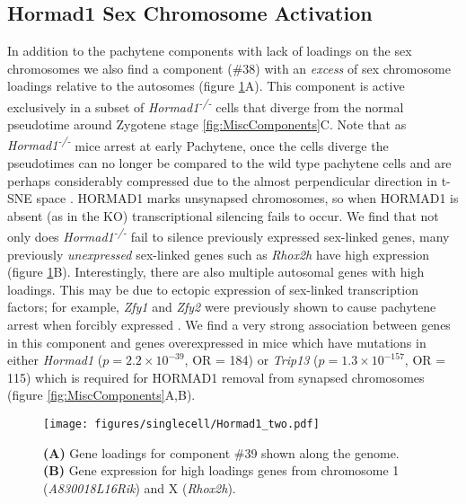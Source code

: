 \subsection{Hormad1 Sex Chromosome Activation}
In addition to the pachytene components with lack of loadings on the sex chromosomes we also find a component (\#38) with an \textit{excess} of sex chromosome loadings relative to the autosomes (figure \ref{fig:Hormad1}A).
This component is active exclusively in a subset of \textit{Hormad1\textsuperscript{-/-}} cells that diverge from the normal pseudotime around Zygotene stage \ref{fig:MiscComponents}C.
Note that as \textit{Hormad1\textsuperscript{-/-}} mice arrest at early Pachytene, once the cells diverge the pseudotimes can no longer be compared to the wild type pachytene cells and are perhaps considerably compressed due to the almost perpendicular direction in t-SNE space \parencite{Shin2010Hormad1}.
HORMAD1 marks unsynapsed chromosomes, so when HORMAD1 is absent (as in the KO) transcriptional silencing fails to occur.
We find that not only does \textit{Hormad1\textsuperscript{-/-}} fail to silence previously expressed sex-linked genes, many previously \textit{unexpressed} sex-linked genes such as \textit{Rhox2h} have high expression (figure \ref{fig:Hormad1}B).
Interestingly, there are also multiple autosomal genes with high loadings.
This may be due to ectopic expression of sex-linked transcription factors; for example, \textit{Zfy1} and \textit{Zfy2} were previously shown to cause pachytene arrest when forcibly expressed \parencite{Royo2010Evidence}.
We find a very strong association between genes in this component and genes overexpressed in mice which have mutations in either \textit{Hormad1} ($p = 2.2\times10^{-39}$, OR = 184) or \textit{Trip13} ($p = 1.3\times10^{-157}$, OR = 115) which is required for HORMAD1 removal from synapsed chromosomes  \parencite{Ortega2016Surveillance, Wojtasz2009Mouse} (figure \ref{fig:MiscComponents}A,B).

\begin{figure}[H]
	\centering
	\texttt{[image: figures/singlecell/Hormad1\_two.pdf]}
	\caption[Hormad1 KO Component]{
		\textbf{(A)} Gene loadings for component \#39 shown along the genome.
		\textbf{(B)} Gene expression for high loadings genes from chromosome 1 (\textit{A830018L16Rik}) and X (\textit{Rhox2h}).
	}
	\label{fig:Hormad1}
\end{figure}


